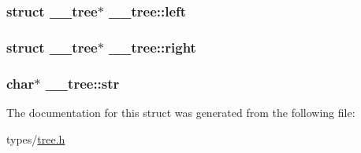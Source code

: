 \subsubsection[{\texorpdfstring{left}{left}}]{\setlength{\rightskip}{0pt plus 5cm}struct {\bf \+\_\+\+\_\+tree}$\ast$ \+\_\+\+\_\+tree\+::left}\hypertarget{struct____tree_add254a73fa2eb8e44b227438da551e5d}{}\label{struct____tree_add254a73fa2eb8e44b227438da551e5d}
\subsubsection[{\texorpdfstring{right}{right}}]{\setlength{\rightskip}{0pt plus 5cm}struct {\bf \+\_\+\+\_\+tree}$\ast$ \+\_\+\+\_\+tree\+::right}\hypertarget{struct____tree_a179e161bb34fc074e90309ced3a08e42}{}\label{struct____tree_a179e161bb34fc074e90309ced3a08e42}
\subsubsection[{\texorpdfstring{str}{str}}]{\setlength{\rightskip}{0pt plus 5cm}char$\ast$ \+\_\+\+\_\+tree\+::str}\hypertarget{struct____tree_a356fa3e93ab5e39c4b58b444d81cec9d}{}\label{struct____tree_a356fa3e93ab5e39c4b58b444d81cec9d}


The documentation for this struct was generated from the following file\+:\begin{DoxyCompactItemize}
\item 
types/\hyperlink{tree_8h}{tree.\+h}\end{DoxyCompactItemize}
